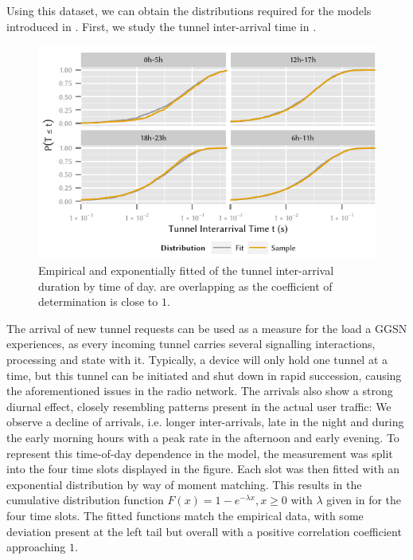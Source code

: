 Using this dataset, we can obtain the distributions required for the models introduced in .
First, we study the tunnel inter-arrival time in .

\begin{figure}
  \centering
  \includegraphics{cloud/virtualized_network_functions/measurement_data/figures/tunnel_iat}
  \caption{Empirical and exponentially fitted  of the tunnel inter-arrival duration by time of day.  are overlapping as the coefficient of determination is close to \(1\).}
  \label{fig:cloud:virtualized_network_functions:measurement_data:evaluation:tunnel_iat}
\end{figure}

The arrival of new tunnel requests can be used as a measure for the load a \gls{GGSN} experiences, as every incoming tunnel carries several signalling interactions, processing and state with it.
Typically, a device will only hold one tunnel at a time, but this tunnel can be initiated and shut down in rapid succession, causing the aforementioned issues in the radio network.
The arrivals also show a strong diurnal effect, closely resembling patterns present in the actual user traffic:
We observe a decline of arrivals, i.e. longer inter-arrivals, late in the night and during the early morning hours with a peak rate in the afternoon and early evening.
To represent this time-of-day dependence in the model, the measurement was split into the four time slots displayed in the figure.
Each slot was then fitted with an exponential distribution by way of moment matching.
This results in the cumulative distribution function \(F(x) = 1- e^{-\lambda x}, x \geq 0\) with \(\lambda\) given in  for the four time slots.
The fitted functions match the empirical data, with some deviation present at the left tail but overall with a positive correlation coefficient approaching \(1\).

